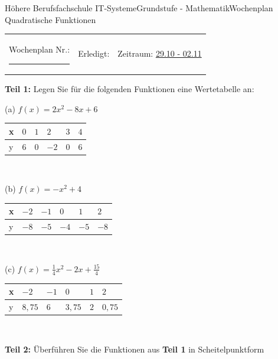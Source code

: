 \documentclass[oneside,openany,headings=optiontotoc,11pt,numbers=noenddot]{scrreprt}
\begin{document}
	\begin{worksheet}{Höhere Berufsfachschule IT-Systeme}{Grundstufe - Mathematik}{Wochenplan Quadratische Funktionen}
		\noindent
		\begin{tabularx}{\textwidth}{XXl}
			Wochenplan Nr.: \rule{0.15\textwidth}{1pt} & Erledigt: & Zeitraum: \underline{29.10 - 02.11}
		\end{tabularx}
	
		\begin{framed}
			\noindent
			\textbf{Teil 1:} Legen Sie für die folgenden Funktionen eine Wertetabelle an:\\
			\par\noindent
			(a) \(f(x) = 2x^2 - 8x +6\)\\
			\par\noindent
			\begin{tabularx}{\textwidth}{X|X|X|X|X|X}
				x & \(0\) & \(1\) & \(2\) & \(3\) & \(4\)\\
				\hline
				y & \(6\) & \(0\) & \(-2\) & \(0\) & \(6\)\\
			\end{tabularx}\\
			\par\noindent
			(b) \(f(x) = -x^2 + 4\)\\
			\par\noindent
			\begin{tabularx}{\textwidth}{X|X|X|X|X|X}
				x & \(-2\) & \(-1\) & \(0\) & \(1\) & \(2\)\\
				\hline
				y & \(-8\) & \(-5\) & \(-4\) & \(-5\) & \(-8\)\\
			\end{tabularx}\\
			\par\noindent
			(c) \(f(x) = \frac{1}{4}x^2 -2x + \frac{15}{4}\)\\
			\par\noindent
			\begin{tabularx}{\textwidth}{X|X|X|X|X|X}
				x & \(-2\) & \(-1\) & \(0\) & \(1\) & \(2\)\\
				\hline
				y & \(8,75\) & \(6\) & \(3,75\) & \(2\) & \(0,75\)\\
			\end{tabularx}\\
		\end{framed}
		\begin{framed}
			\noindent
			\textbf{Teil 2:} Überführen Sie die Funktionen aus \textbf{Teil 1} in Scheitelpunktform\\

\end{framed}
\end{worksheet}
\end{document}
